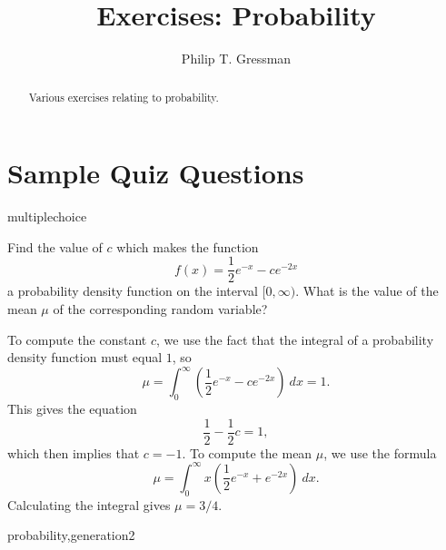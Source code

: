 \documentclass{ximera}
\title{Exercises: Probability}
\author{Philip T. Gressman}
\begin{document}
\begin{abstract}
Various exercises relating to probability.
\end{abstract}
\maketitle


\section*{Sample Quiz Questions}
\begin{question}[ProbabAssort001]
\begin{type}
multiplechoice
\end{type}
Find the value of \(c\) which makes the function
\[f(x) = \frac{1}{2}e^{-x} - ce^{-2x}\]
a probability density function on the interval \([0, \infty)\). 
What is the value of the mean \(\mu\) of the corresponding random variable?
\begin{multiplechoice}
 \choicebreak
{}
\end{multiplechoice}
\begin{feedback}
To compute the constant \(c\), we use the fact that the integral of a probability density function must equal \(1\), so 
\[ \mu = \int_{0}^{\infty} \left( \frac{1}{2}e^{-x} - ce^{-2x} \right) ~ dx = 1.\]
This gives the equation \[\frac{1}{2} - \frac{1}{2}c = 1,\]
which then implies that \(c = -1\). To compute the mean \(\mu\), we use the formula
\[ \mu = \int_{0}^{\infty} x \left( \frac{1}{2}e^{-x} + e^{-2x} \right) ~ dx.\]
 Calculating the integral gives \(\mu = 3/4.\)
\end{feedback}
\begin{keywords}
probability,generation2
\end{keywords}
\end{question}
\end{document}
